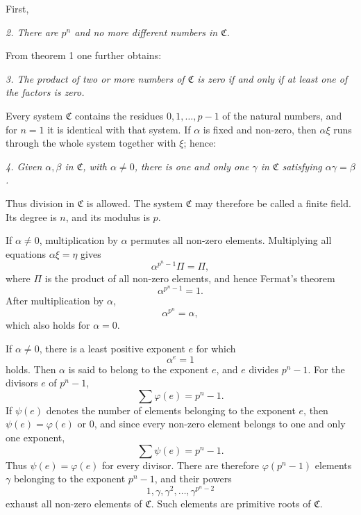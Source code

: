\documentclass[11pt]{article}
\begin{document}
First,

\emph{2. There are $p^n$ and no more different numbers in $\mathfrak C$.}

From theorem 1 one further obtains:

\emph{3. The product of two or more numbers of $\mathfrak C$ is zero if and only if at least one of the factors is zero.}

Every system $\mathfrak C$ contains the residues $0,1,\ldots,p-1$ of the natural numbers, and for $n=1$ it is identical with that system. If $\alpha$ is fixed and non-zero, then $\alpha\xi$ runs through the whole system together with $\xi$; hence:

\emph{4. Given $\alpha,\beta$ in $\mathfrak C$, with $\alpha\ne0$, there is one and only one $\gamma$ in $\mathfrak C$ satisfying $\alpha\gamma=\beta$.}

Thus division in $\mathfrak C$ is allowed. The system $\mathfrak C$ may therefore be called a finite field. Its degree is $n$, and its modulus is $p$.

If $\alpha\ne0$, multiplication by $\alpha$ permutes all non-zero elements. Multiplying all equations $\alpha\xi=\eta$ gives
\[
 \alpha^{p^n-1}\Pi=\Pi,
\]
where $\Pi$ is the product of all non-zero elements, and hence Fermat's theorem
\begin{equation}
 \alpha^{p^n-1}=1. \tag{3}
\end{equation}
After multiplication by $\alpha$,
\begin{equation}
 \alpha^{p^n}=\alpha, \tag{4}
\end{equation}
which also holds for $\alpha=0$.

If $\alpha\ne0$, there is a least positive exponent $e$ for which
\begin{equation}
 \alpha^e=1 \tag{5}
\end{equation}
holds. Then $\alpha$ is said to belong to the exponent $e$, and $e$ divides $p^n-1$. For the divisors $e$ of $p^n-1$,
\begin{equation}
 \sum \varphi(e)=p^n-1. \tag{6}
\end{equation}
If $\psi(e)$ denotes the number of elements belonging to the exponent $e$, then $\psi(e)=\varphi(e)$ or $0$, and since every non-zero element belongs to one and only one exponent,
\begin{equation}
 \sum \psi(e)=p^n-1. \tag{7}
\end{equation}
Thus $\psi(e)=\varphi(e)$ for every divisor. There are therefore $\varphi(p^n-1)$ elements $\gamma$ belonging to the exponent $p^n-1$, and their powers
\begin{equation}
 1,\gamma,\gamma^2,\ldots,\gamma^{p^n-2} \tag{8}
\end{equation}
exhaust all non-zero elements of $\mathfrak C$. Such elements are primitive roots of $\mathfrak C$.
\end{document}
